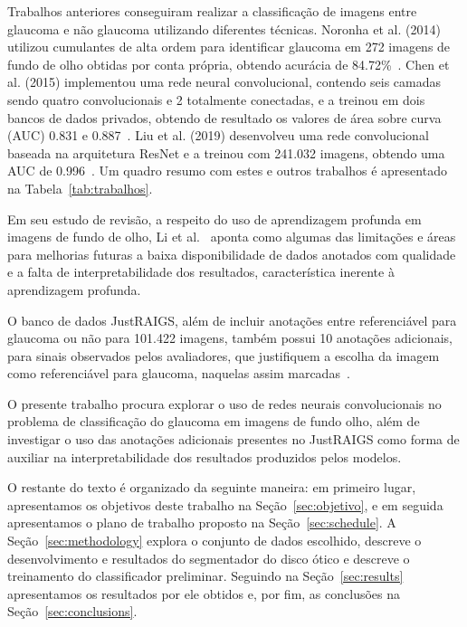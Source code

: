 \documentclass[12pt]{article}
\begin{document}
Trabalhos anteriores conseguiram realizar a classificação de imagens entre glaucoma e não glaucoma utilizando diferentes técnicas. Noronha et al. (2014) utilizou cumulantes de alta ordem para identificar glaucoma em 272 imagens de fundo de olho obtidas por conta própria, obtendo acurácia de 84.72\%~\cite{noronha2014hoc}. Chen et al. (2015) implementou uma rede neural convolucional, contendo seis camadas sendo quatro convolucionais e 2 totalmente conectadas, e a treinou em dois bancos de dados privados, obtendo de resultado os valores de área sobre curva (AUC) 0.831 e 0.887~\cite{chen2015cnn}. Liu et al. (2019) desenvolveu uma rede convolucional baseada na arquitetura ResNet e a treinou com 241.032 imagens, obtendo uma AUC de 0.996~\cite{liu_cnn_2019}. Um quadro resumo com estes e outros trabalhos é apresentado na Tabela~\ref{tab:trabalhos}.

Em seu estudo de revisão, a respeito do uso de aprendizagem profunda em imagens de fundo de olho, Li et al.~\cite{li_review_2021} aponta como algumas das limitações e áreas para melhorias futuras a baixa disponibilidade de dados anotados com qualidade e a falta de interpretabilidade dos resultados, característica inerente à aprendizagem profunda.

O banco de dados JustRAIGS, além de incluir anotações entre referenciável para glaucoma ou não para 101.422 imagens, também possui 10 anotações adicionais, para sinais observados pelos avaliadores, que justifiquem a escolha da imagem como referenciável para glaucoma, naquelas assim marcadas~\cite{justraigs_article}.

O presente trabalho procura explorar o uso de redes neurais convolucionais no problema de classificação do glaucoma em imagens de fundo olho, além de investigar o uso das anotações adicionais presentes no JustRAIGS como forma de auxiliar na interpretabilidade dos resultados produzidos pelos modelos.

O restante do texto é organizado da seguinte maneira: em primeiro lugar, apresentamos os objetivos deste trabalho na Seção~\ref{sec:objetivo}, e em seguida apresentamos o plano de trabalho proposto na Seção~\ref{sec:schedule}. A Seção~\ref{sec:methodology} explora o conjunto de dados escolhido, descreve o desenvolvimento e resultados do segmentador do disco ótico e descreve o treinamento do classificador preliminar. Seguindo na Seção~\ref{sec:results} apresentamos os resultados por ele obtidos e, por fim, as conclusões na Seção~\ref{sec:conclusions}.
\end{document}
